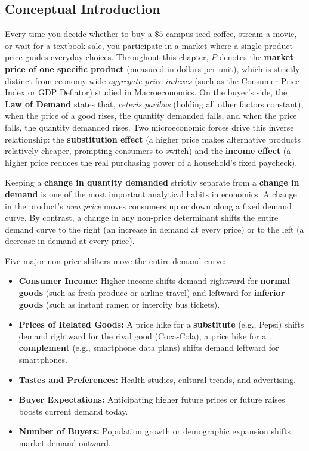 \documentclass[11pt,letterpaper]{article}
\begin{document}
\subsection*{Conceptual Introduction}
Every time you decide whether to buy a $\$5$ campus iced coffee, stream a movie, or wait for a textbook sale, you participate in a market where a single-product price guides everyday choices. Throughout this chapter, $P$ denotes the \textbf{market price of one specific product} (measured in dollars per unit), which is strictly distinct from economy-wide \emph{aggregate price indexes} (such as the Consumer Price Index or GDP Deflator) studied in Macroeconomics. On the buyer's side, the \textbf{Law of Demand} states that, \emph{ceteris paribus} (holding all other factors constant), when the price of a good rises, the quantity demanded falls, and when the price falls, the quantity demanded rises. Two microeconomic forces drive this inverse relationship: the \textbf{substitution effect} (a higher price makes alternative products relatively cheaper, prompting consumers to switch) and the \textbf{income effect} (a higher price reduces the real purchasing power of a household's fixed paycheck).

Keeping a \textbf{change in quantity demanded} strictly separate from a \textbf{change in demand} is one of the most important analytical habits in economics. A change in the product's \emph{own price} moves consumers up or down along a fixed demand curve. By contrast, a change in any non-price determinant shifts the entire demand curve to the right (an increase in demand at every price) or to the left (a decrease in demand at every price).

Five major non-price shifters move the entire demand curve:
\begin{itemize}
    \item \textbf{Consumer Income:} Higher income shifts demand rightward for \textbf{normal goods} (such as fresh produce or airline travel) and leftward for \textbf{inferior goods} (such as instant ramen or intercity bus tickets).
    \item \textbf{Prices of Related Goods:} A price hike for a \textbf{substitute} (e.g., Pepsi) shifts demand rightward for the rival good (Coca-Cola); a price hike for a \textbf{complement} (e.g., smartphone data plans) shifts demand leftward for smartphones.
    \item \textbf{Tastes and Preferences:} Health studies, cultural trends, and advertising.
    \item \textbf{Buyer Expectations:} Anticipating higher future prices or future raises boosts current demand today.
    \item \textbf{Number of Buyers:} Population growth or demographic expansion shifts market demand outward.
\end{itemize}
\end{document}
